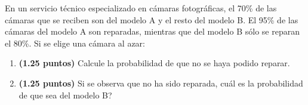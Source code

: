 
En un servicio técnico especializado en cámaras fotográficas, el 70\% de las cámaras que se reciben son del modelo A y el resto del modelo B. El 95\% de las cámaras del modelo A son reparadas, mientras que del modelo B sólo se reparan el 80\%. Si se elige una cámara al azar:
\begin{enumerate}[label=\alph*)]
\item \textbf{(1.25 puntos)} Calcule la probabilidad de que no se haya podido reparar.
\item \textbf{(1.25 puntos)} Si se observa que no ha sido reparada, \textquestiondown{}cuál es la probabilidad de que sea del modelo B?
\end{enumerate}
